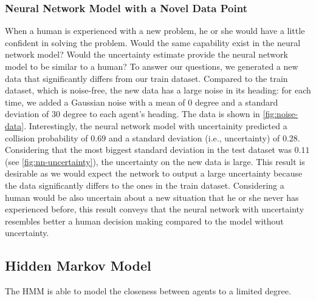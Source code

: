 \subsubsection{Neural Network Model with a Novel Data Point}
When a human is experienced with a new problem, he or she would have a little confident in solving the problem.  
Would the same capability exist in the neural network model? 
Would the uncertainty estimate provide the neural network model to be similar to a human?
To answer our questions, we generated a new data that significantly differs from our train dataset. 
Compared to the train dataset, which is noise-free, the new data has a large noise in its heading: for each time, we added a Gaussian noise with a mean of $0$ degree and a standard deviation of $30$ degree to each agent's heading.
The data is shown in \cref{fig:noise-data}. Interestingly, the neural network model with uncertainity predicted a collision probability of $0.69$ and a standard deviation (i.e., uncertainty) of $0.28$. 
Considering that the most biggest standard deviation in the test dataset was $0.11$ (see \cref{fig:nn-uncertainty}), the uncertainty on the new data is large. 
This result is desirable as we would expect the network to output a large uncertainty because the data significantly differs to the ones in the train dataset.
Considering a human would be also uncertain about a new situation that he or she never has experienced before, this result conveys that the neural network with uncertainty resembles better a human decision making compared to the model without uncertainty.

\subsection{Hidden Markov Model}
The HMM is able to model the closeness between agents to a limited degree.

